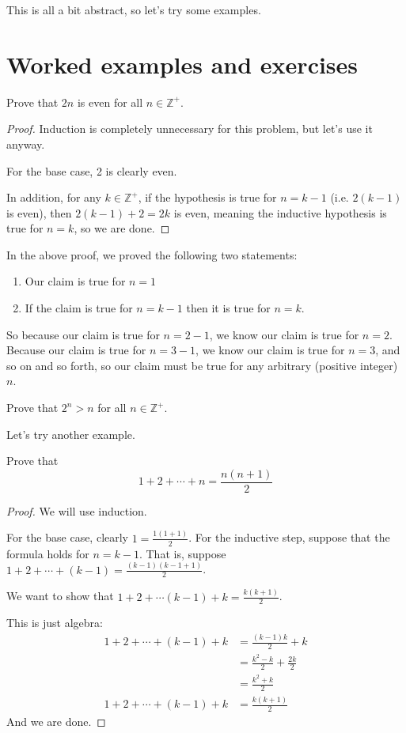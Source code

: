 \documentclass[a4paper]{scrartcl}
\begin{document}
\vspace{12pt}

This is all a bit abstract, so let's try some examples.

\section{Worked examples and exercises}

\begin{example}
	Prove that $2n$ is even for all $n \in \mathbb{Z}^+$.
\end{example}
\begin{proof}
	Induction is completely unnecessary for this problem, but let's use it anyway.

	For the base case, 2 is clearly even. 

	In addition, for any $k \in \mathbb{Z}^+$, if the hypothesis is true for $n=k-1$ (i.e. $2(k-1)$ is even), then $2(k-1)+2 = 2k$ is even, meaning the inductive hypothesis is true for $n=k$, so we are done.
\end{proof}


In the above proof, we proved the following two statements:
\begin{enumerate}
	\item Our claim is true for $n=1$
	\item If the claim is true for $n=k-1$ then it is true for $n=k$.
\end{enumerate}
		So because our claim is true for $n=2-1$, we know our claim is true for $n=2$. Because our claim is true for $n=3-1$, we know our claim is true for $n=3$, and so on and so forth, so our claim must be true for any arbitrary (positive integer) $n$.

\begin{exercise}
	Prove that $2^n > n$ for all $n \in \mathbb{Z}^+$.
\end{exercise}

Let's try another example.

\begin{example}
	Prove that
	\[1 + 2 + \cdots + n = \frac{n\left(n+1\right)}{2}\]
\end{example}
\begin{proof}
	We will use induction.

	For the base case, clearly $1 = \frac{1(1+1)}{2}$.
	For the inductive step, suppose that the formula holds for $n=k-1$. That is, suppose $1 + 2 + \cdots + \left(k-1\right) = \frac{(k-1)(k-1+1)}{2}$.
	
	We want to show that $1 + 2 + \cdots \left(k-1\right) + k = \frac{k(k+1)}{2}$.

	This is just algebra:
	\begin{align*}
		1 + 2 + \cdots + \left(k-1\right) + k &= \frac{(k-1)k}{2} + k \\
					 &= \frac{k^2 - k}{2} + \frac{2k}{2} \\
					 &= \frac{k^2 + k}{2} \\
		1 + 2 + \cdots + \left(k-1\right) + k &= \frac{k(k+1)}{2}
	\end{align*}
	And we are done.
\end{proof}
\end{document}
